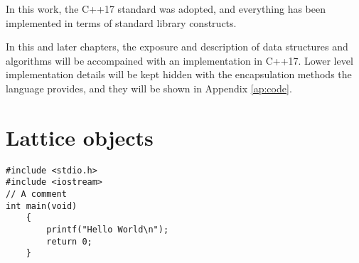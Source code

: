In this work, the C++17 standard was adopted,
and everything has been implemented in terms of standard library constructs.

In this and later chapters, the exposure and description of data structures and algorithms will be accompained with an implementation in C++17.
Lower level implementation details will be kept hidden with the encapsulation methods the language provides,
and they will be shown in Appendix \ref{ap:code}.

\section{Lattice objects}



\begin{lstlisting}[caption={}]
#include <stdio.h>
#include <iostream>
// A comment
int main(void)
    {
        printf("Hello World\n");
        return 0;
    }
\end{lstlisting}

